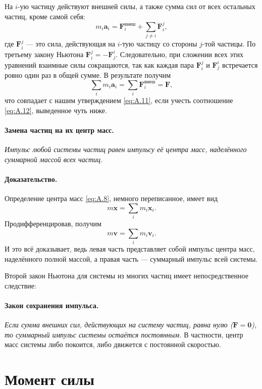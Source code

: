 На $i$-ую частицу действуют внешней силы, а также сумма сил от всех остальных частиц, кроме самой себя:
\[m_i \mathbf{a}_i=\mathbf{F}_i^{\text{внеш}}+\sum_{j \neq i} \mathbf{F}_{i}^{j},\]
где $\mathbf{F}_{i}^{j}$ --- это сила, действующая на $i$-тую частицу
со стороны $j$-той частицы.
По третьему закону Ньютона $\mathbf{F}_{i}^{j}=-\mathbf{F}_{j}^{i}$.
Следовательно, при сложении всех этих уравнений взаимные силы
сокращаются, так как каждая пара $\mathbf{F}_{i}^{j}$ и $\mathbf{F}_{j}^{i}$
встречается ровно один раз в общей сумме.
В результате получим
\[
\sum_i m_i \mathbf{a}_i=\sum_i \mathbf{F}_i^{\text{внеш}}=\mathbf{F},
\]
что совпадает с нашим утверждением \eqref{eq:A.11}, если учесть соотношение \eqref{eq:A.12}, выведенное чуть ниже.

\paragraph{Замена частиц на их центр масс.}
\emph{Импульс любой системы частиц равен импульсу её центра масс, наделённого суммарной массой всех частиц.}

\paragraph{Доказательство.}
Определение центра масс \eqref{eq:A.8}, немного
переписанное, имеет вид
\begin{equation}
    m \mathbf{x}=\sum_i m_i \mathbf{x}_i.
    \label{eq:A.12}
\end{equation}
Продифференцировав, получим
\[m \mathbf{v}=\sum_i m_i \mathbf{v}_i.\]
И это всё доказывает, ведь левая часть представляет собой импульс центра масс, наделённого полной массой,
а правая часть --- суммарный импульс всей системы.

Второй закон Ньютона для системы из многих частиц имеет непосредственное следствие:

\paragraph{Закон сохранения импульса.} \emph{Если сумма внешних сил, действующих на систему частиц, равна нулю ($\mathbf{F}=\mathbf{0}$), то суммарный импульс системы остаётся постоянным.}
В частности, центр масс системы либо покоится, либо движется с постоянной скоростью.
\label{Импульс:end}

\section{Момент силы}\label{sec:A.5}

